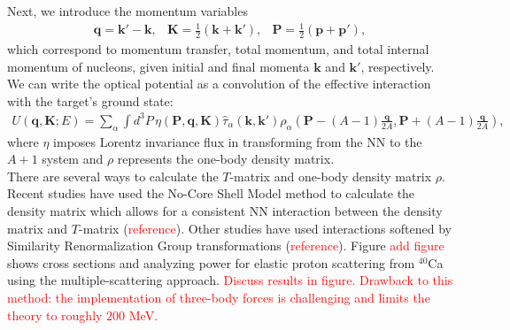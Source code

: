 \documentclass[preprintnumbers,floatfix,aps,prc,preprint,nofootinbib]{revtex4-1}
\begin{document}
Next, we introduce the momentum variables
%
\begin{subequations}
	\label{eq:momenta}
	\begin{eqnarray}
		\label{eq:momentum_transfer}
		\textbf{q} = \textbf{k}' - \textbf{k},
	\end{eqnarray}
	\begin{eqnarray}
		\label{eq:total_momentum}
		\textbf{K} = \frac{1}{2} ( \textbf{k} + \textbf{k}' ),
	\end{eqnarray}
	\begin{eqnarray}
		\label{eq:internal_momentum}
		\textbf{P} = \frac{1}{2} ( \textbf{p} + \textbf{p}' ),
	\end{eqnarray}
\end{subequations}
%
which correspond to momentum transfer, total momentum, and total internal momentum of nucleons, given initial and final momenta $\textbf{k}$ and $\textbf{k}'$, respectively. We can write the optical potential as a convolution of the effective interaction with the target's ground state:
%
\begin{eqnarray}
	\label{eq:ms_optical_potential}
	U(\textbf{q}, \textbf{K}; E) = \sum_{\alpha} \int d^3 P \, \eta(\textbf{P}, \textbf{q}, \textbf{K}) \hat{\tau}_{\alpha}(\textbf{k}, \textbf{k}') \rho_{\alpha}(\textbf{P} - (A-1) \frac{\textbf{q}}{2 A}, \textbf{P} + (A-1) \frac{\textbf{q}}{2 A}),
\end{eqnarray}
%
where $\eta$ imposes Lorentz invariance flux in transforming from the NN to the $A+1$ system and $\rho$ represents the one-body density matrix.
\\

There are several ways to calculate the $T$-matrix and one-body density matrix $\rho$. Recent studies have used the No-Core Shell Model method to calculate the density matrix which allows for a consistent NN interaction between the density matrix and $T$-matrix (\textcolor{red}{reference}). Other studies have used interactions softened by Similarity Renormalization Group transformations (\textcolor{red}{reference}). Figure \textcolor{red}{add figure} shows cross sections and analyzing power for elastic proton scattering from $^{40}$Ca using the multiple-scattering approach. \textcolor{red}{Discuss results in figure. Drawback to this method: the implementation of three-body forces is challenging and limits the theory to roughly $200$ MeV.}
\\
		
	
\end{document}
